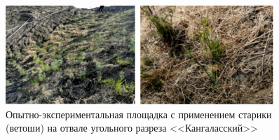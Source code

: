 \begin{figure}
  \begin{center}
    \includegraphics[width=0.9\textwidth]{authors/nekiforov-fig4.jpg}
  \end{center}
  \caption{Опытно-экспериментальная площадка с применением старики (ветоши) на отвале угольного разреза <<Кангаласский>>}
  \label{fig:nekiforov-fig4}
\end{figure}
